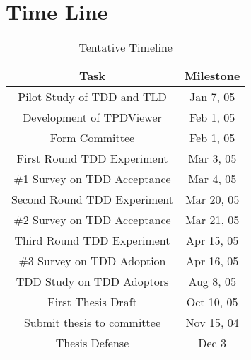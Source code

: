 \chapter{Time Line}
\label{sec:timelinel}

\begin{table}[ht]
\centering
\caption{Tentative Timeline}
\begin{tabular}{|c|c|} \hline
Task &  Milestone \\ \hline
Pilot Study of TDD and TLD & Jan 7, 05 \\ \hline
Development of TPDViewer & Feb 1, 05 \\ \hline
Form Committee & Feb 1, 05 \\ \hline
First Round TDD Experiment &  Mar 3, 05 \\ \hline
\#1 Survey on TDD Acceptance & Mar 4, 05 \\ \hline
Second Round TDD Experiment & Mar 20, 05 \\ \hline
\#2 Survey on TDD Acceptance & Mar 21, 05 \\ \hline
Third Round TDD Experiment & Apr 15, 05 \\ \hline
\#3 Survey on TDD Adoption & Apr 16, 05 \\ \hline
TDD Study on TDD Adoptors & Aug 8, 05\\ \hline
First Thesis Draft & Oct 10, 05 \\ \hline
Submit thesis to committee  & Nov 15, 04 \\ \hline
Thesis Defense & Dec 3  \\ \hline
\end{tabular}
\end{table}




















